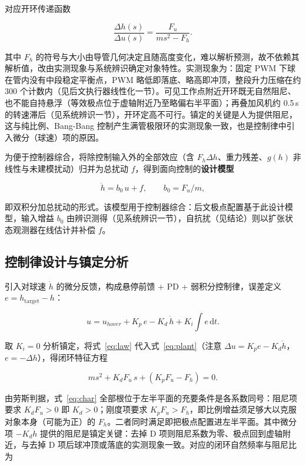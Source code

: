 \documentclass[12pt,a4paper]{ctexart}
\begin{document}
对应开环传递函数

\begin{equation}
\frac{\Delta h(s)}{\Delta u(s)}=\frac{F_u}{m s^2 - F_h}.
\label{eq:tf}
\end{equation}

其中 $F_h$ 的符号与大小由导管几何决定且随高度变化，难以解析预测，故不依赖其解析值，改由实测现象与系统辨识确定对象特性。实测现象为：固定 PWM 下球在管内没有中段稳定平衡点，PWM 略低即落底、略高即冲顶，整段升力压缩在约 300 个计数内（见后文执行器线性化一节）。可见工作点附近开环既无自然阻尼、也不能自持悬浮（等效极点位于虚轴附近乃至略偏右半平面）；再叠加风机约 0.5\,s 的转速滞后（见系统辨识一节），开环定高不可行。镇定的关键是人为提供阻尼，这与纯比例、Bang-Bang 控制产生满管极限环的实测现象一致，也是控制律中引入微分（球速）项的原因。

为便于控制器综合，将除控制输入外的全部效应（含 $F_h\Delta h$、重力残差、$g(h)$ 非线性与未建模扰动）归并为总扰动 $f$，得到面向控制的\textbf{设计模型}

\begin{equation}
\ddot{h}=b_0\,u+f ,\qquad b_0=F_u/m ,
\label{eq:design}
\end{equation}

即双积分加总扰动的形式。该模型用于控制器综合：后文极点配置基于此设计模型，输入增益 $b_0$ 由辨识测得（见系统辨识一节），自抗扰（见结论）则以扩张状态观测器在线估计并补偿 $f$。

\subsection{控制律设计与镇定分析}

引入对球速 $\dot{h}$ 的微分反馈，构成悬停前馈 + PD + 弱积分控制律，误差定义 $e=h_{\mathrm{target}}-h$：

\begin{equation}
u=u_{hover}+K_p\,e-K_d\,\dot{h}+K_i\!\int e\,\mathrm{d}t .
\label{eq:law}
\end{equation}

取 $K_i=0$ 分析镇定，将式~\eqref{eq:law} 代入式~\eqref{eq:plant}（注意 $\Delta u = K_p e - K_d\dot h$，$e=-\Delta h$），得闭环特征方程

\begin{equation}
m s^2 + K_d F_u\, s + (K_p F_u - F_h)=0 .
\label{eq:char}
\end{equation}

由劳斯判据，式~\eqref{eq:char} 全部根位于左半平面的充要条件是各系数同号：阻尼项要求 $K_d F_u>0$ 即 $K_d>0$；刚度项要求 $K_p F_u>F_h$，即比例增益须足够大以克服对象本身（可能为正）的 $F_h$。二者同时满足即把极点配置进左半平面。其中微分项 $-K_d\dot h$ 提供的阻尼是镇定关键：去掉 D 项则阻尼系数为零、极点回到虚轴附近，与去掉 D 项后球冲顶或落底的实测现象一致。对应的闭环自然频率与阻尼比为
\end{document}

